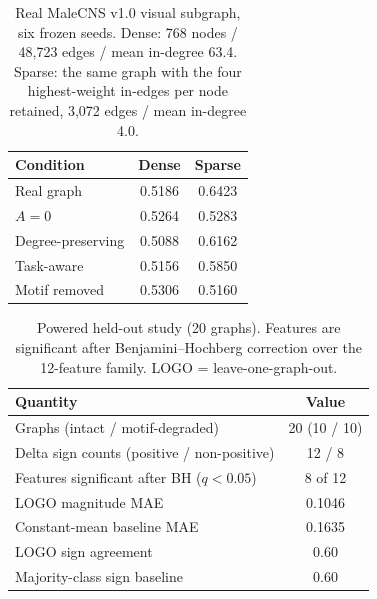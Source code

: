 
\begin{table}[t]\centering
\caption{Real MaleCNS v1.0 visual subgraph, six frozen seeds. Dense: 768 nodes / 48,723 edges / mean in-degree 63.4. Sparse: the same graph with the four highest-weight in-edges per node retained, 3,072 edges / mean in-degree 4.0.}\label{tab:real}\small
\begin{tabular}{lcc}\toprule Condition & Dense & Sparse \\ \midrule
Real graph & 0.5186 & 0.6423 \\
$A=0$ & 0.5264 & 0.5283 \\
Degree-preserving & 0.5088 & 0.6162 \\
Task-aware & 0.5156 & 0.5850 \\
Motif removed & 0.5306 & 0.5160 \\
\bottomrule\end{tabular}
\end{table}

\begin{table}[t]\centering
\caption{Powered held-out study (20 graphs). Features are significant after Benjamini--Hochberg correction over the 12-feature family. LOGO = leave-one-graph-out.}\label{tab:heldout}\small
\begin{tabular}{lc}\toprule Quantity & Value \\ \midrule
Graphs (intact / motif-degraded) & 20 (10 / 10) \\
Delta sign counts (positive / non-positive) & 12 / 8 \\
Features significant after BH ($q<0.05$) & 8 of 12 \\
LOGO magnitude MAE & 0.1046 \\
Constant-mean baseline MAE & 0.1635 \\
LOGO sign agreement & 0.60 \\
Majority-class sign baseline & 0.60 \\
\bottomrule\end{tabular}
\end{table}
